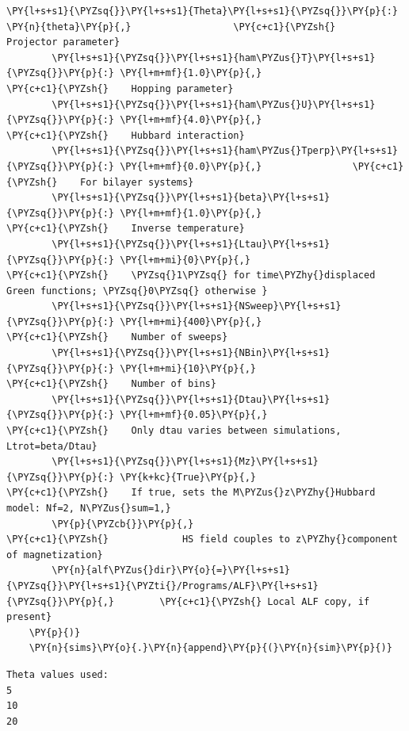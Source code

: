 \begin{tcolorbox}[breakable, size=fbox, boxrule=1pt, pad at break*=1mm,colback=cellbackground, colframe=cellborder]
\begin{Verbatim}[commandchars=\\\{\}]
        \PY{l+s+s1}{\PYZsq{}}\PY{l+s+s1}{Theta}\PY{l+s+s1}{\PYZsq{}}\PY{p}{:} \PY{n}{theta}\PY{p}{,}                  \PY{c+c1}{\PYZsh{}    Projector parameter}
        \PY{l+s+s1}{\PYZsq{}}\PY{l+s+s1}{ham\PYZus{}T}\PY{l+s+s1}{\PYZsq{}}\PY{p}{:} \PY{l+m+mf}{1.0}\PY{p}{,}                    \PY{c+c1}{\PYZsh{}    Hopping parameter}
        \PY{l+s+s1}{\PYZsq{}}\PY{l+s+s1}{ham\PYZus{}U}\PY{l+s+s1}{\PYZsq{}}\PY{p}{:} \PY{l+m+mf}{4.0}\PY{p}{,}                    \PY{c+c1}{\PYZsh{}    Hubbard interaction}
        \PY{l+s+s1}{\PYZsq{}}\PY{l+s+s1}{ham\PYZus{}Tperp}\PY{l+s+s1}{\PYZsq{}}\PY{p}{:} \PY{l+m+mf}{0.0}\PY{p}{,}                \PY{c+c1}{\PYZsh{}    For bilayer systems}
        \PY{l+s+s1}{\PYZsq{}}\PY{l+s+s1}{beta}\PY{l+s+s1}{\PYZsq{}}\PY{p}{:} \PY{l+m+mf}{1.0}\PY{p}{,}                     \PY{c+c1}{\PYZsh{}    Inverse temperature}
        \PY{l+s+s1}{\PYZsq{}}\PY{l+s+s1}{Ltau}\PY{l+s+s1}{\PYZsq{}}\PY{p}{:} \PY{l+m+mi}{0}\PY{p}{,}                       \PY{c+c1}{\PYZsh{}    \PYZsq{}1\PYZsq{} for time\PYZhy{}displaced Green functions; \PYZsq{}0\PYZsq{} otherwise }
        \PY{l+s+s1}{\PYZsq{}}\PY{l+s+s1}{NSweep}\PY{l+s+s1}{\PYZsq{}}\PY{p}{:} \PY{l+m+mi}{400}\PY{p}{,}                   \PY{c+c1}{\PYZsh{}    Number of sweeps}
        \PY{l+s+s1}{\PYZsq{}}\PY{l+s+s1}{NBin}\PY{l+s+s1}{\PYZsq{}}\PY{p}{:} \PY{l+m+mi}{10}\PY{p}{,}                      \PY{c+c1}{\PYZsh{}    Number of bins}
        \PY{l+s+s1}{\PYZsq{}}\PY{l+s+s1}{Dtau}\PY{l+s+s1}{\PYZsq{}}\PY{p}{:} \PY{l+m+mf}{0.05}\PY{p}{,}                    \PY{c+c1}{\PYZsh{}    Only dtau varies between simulations, Ltrot=beta/Dtau}
        \PY{l+s+s1}{\PYZsq{}}\PY{l+s+s1}{Mz}\PY{l+s+s1}{\PYZsq{}}\PY{p}{:} \PY{k+kc}{True}\PY{p}{,}                      \PY{c+c1}{\PYZsh{}    If true, sets the M\PYZus{}z\PYZhy{}Hubbard model: Nf=2, N\PYZus{}sum=1,}
        \PY{p}{\PYZcb{}}\PY{p}{,}                               \PY{c+c1}{\PYZsh{}             HS field couples to z\PYZhy{}component of magnetization}
        \PY{n}{alf\PYZus{}dir}\PY{o}{=}\PY{l+s+s1}{\PYZsq{}}\PY{l+s+s1}{\PYZti{}/Programs/ALF}\PY{l+s+s1}{\PYZsq{}}\PY{p}{,}        \PY{c+c1}{\PYZsh{} Local ALF copy, if present}
    \PY{p}{)}
    \PY{n}{sims}\PY{o}{.}\PY{n}{append}\PY{p}{(}\PY{n}{sim}\PY{p}{)}
\end{Verbatim}
\end{tcolorbox}

    \begin{Verbatim}[commandchars=\\\{\}]
Theta values used:
5
10
20
    \end{Verbatim}


